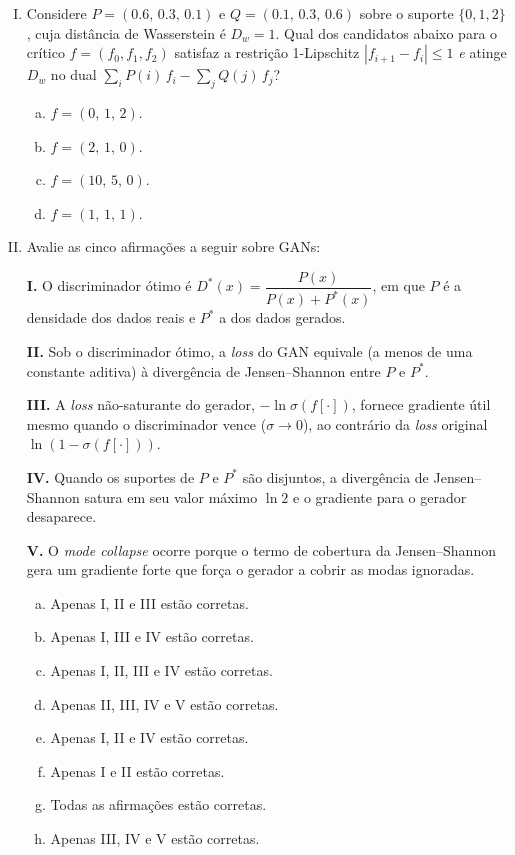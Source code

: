 \documentclass{dlproblemset}
\begin{document}
\begin{enumerate}[I)]
\item {} Considere $P = (0.6,\, 0.3,\, 0.1)$ e $Q = (0.1,\, 0.3,\, 0.6)$ sobre o suporte $\{0, 1, 2\}$, cuja distância de Wasserstein é $D_{w} = 1$. Qual dos candidatos abaixo para o crítico $f = (f_0, f_1, f_2)$ satisfaz a restrição 1-Lipschitz $|f_{i+1} - f_i| \le 1$ \emph{e} atinge $D_{w}$ no dual $\sum_{i} P(i)\,f_i - \sum_{j} Q(j)\,f_j$?
\begin{enumerate}[(a)]
    \item $f = (0,\, 1,\, 2)$.
    \item $f = (2,\, 1,\, 0)$.
    \item $f = (10,\, 5,\, 0)$.
    \item $f = (1,\, 1,\, 1)$.
\end{enumerate}


\item Avalie as cinco afirmações a seguir sobre GANs:

\textbf{I.} O discriminador ótimo é $D^{*}(x) = \dfrac{P(x)}{P(x) + P^{*}(x)}$, em que $P$ é a densidade dos dados reais e $P^{*}$ a dos dados gerados.

\textbf{II.} Sob o discriminador ótimo, a \emph{loss} do GAN equivale (a menos de uma constante aditiva) à divergência de Jensen--Shannon entre $P$ e $P^{*}$.

\textbf{III.} A \emph{loss} não-saturante do gerador, $-\ln\sigma(f[\cdot])$, fornece gradiente útil mesmo quando o discriminador vence ($\sigma \to 0$), ao contrário da \emph{loss} original $\ln(1 - \sigma(f[\cdot]))$.

\textbf{IV.} Quando os suportes de $P$ e $P^{*}$ são disjuntos, a divergência de Jensen--Shannon satura em seu valor máximo $\ln 2$ e o gradiente para o gerador desaparece.

\textbf{V.} O \textit{mode collapse} ocorre porque o termo de cobertura da Jensen--Shannon gera um gradiente forte que força o gerador a cobrir as modas ignoradas.

\begin{enumerate}[(a)]
    \item Apenas I, II e III estão corretas.
    \item Apenas I, III e IV estão corretas.
    \item Apenas I, II, III e IV estão corretas.
    \item Apenas II, III, IV e V estão corretas.
    \item Apenas I, II e IV estão corretas.
    \item Apenas I e II estão corretas.
    \item Todas as afirmações estão corretas.
    \item Apenas III, IV e V estão corretas.
\end{enumerate}


\end{enumerate}
\end{document}
